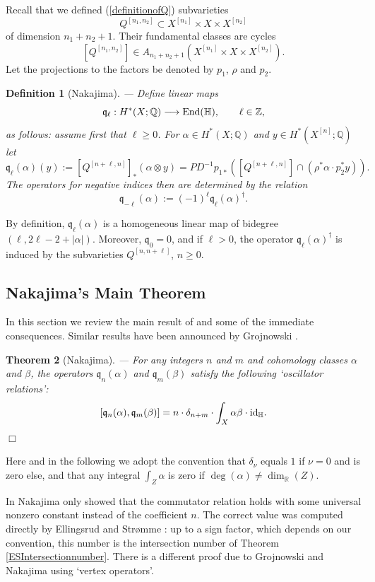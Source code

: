 \documentclass[twoside,11pt]{article}
\newtheorem{theorem}{Theorem}[section]
\newtheorem{definition}[theorem]{Definition}
\newcommand{\qed}{\hspace*{\fill}$\Box$\vspace{2ex}}
\newcommand{\IH}{{\mathbb H}}
\newcommand{\IQ}{{\mathbb Q}}
\newcommand{\IR}{{\mathbb R}}
\newcommand{\IZ}{{\mathbb Z}}
\newcommand{\gothq}{{\mathfrak q}}
\newcommand{\tensor}{\otimes}
\newcommand{\End}{{\rm End}}
\newcommand{\qq}{\gothq}
\newcommand{\id}{{\rm id}}
\newcommand{\lra}{\longrightarrow}
\begin{document}
Recall that we defined (\ref{definitionofQ}) subvarieties
$$Q^{[n_1,n_2]}\subset X^{[n_1]}\times X\times X^{[n_2]}$$
of dimension $n_1+n_2+1$. Their fundamental classes are cycles
$$[Q^{[n_1,n_2]}]\in A_{n_1+n_2+1}(X^{[n_1]}\times X\times X^{[n_2]}).$$
Let the projections to the factors be denoted by $p_1$, $\rho$ and $p_2$.

\begin{definition}[Nakajima]\label{definitionofoscillators}--- Define
linear maps
$$\qq_{\ell}:H^*(X;\IQ)\lra \End(\IH),\qquad \ell\in\IZ,$$
as follows: assume first that $\ell\geq0$.
For $\alpha\in H^*(X;\IQ)$ and $y\in H^*(X^{[n]};\IQ)$ let
$$\qq_\ell(\alpha)(y):=[Q^{[n+\ell,n]}]_*(\alpha\tensor y)=PD^{-1}p_{1*}(
[Q^{[n+\ell,n]}]\cap (\rho^*\alpha\cdot p_2^*y)).$$
The operators for negative indices then are determined by the relation $$\qq_{-\ell}(\alpha):=(-1)^\ell\qq_{\ell}(\alpha)^\dagger.$$
\end{definition}

By definition, $\qq_\ell(\alpha)$ is a homogeneous linear map of
bidegree $(\ell, 2\ell-2+|\alpha|)$. Moreover, $\qq_0=0$, and if $\ell>0$,
the operator $\qq_{\ell}(\alpha)^\dagger$ is induced by the subvarieties
$Q^{[n,n+\ell]}$, $n\geq 0$.

\subsection{Nakajima's Main Theorem}

In this section we review the main result of \cite{Nakajima} and some of the
immediate consequences. Similar results have been announced by Grojnowski
\cite{Grojnowski}. 

\begin{theorem}[Nakajima]\label{oscillatorrelation}---
For any integers $n$ and $m$ and cohomology classes $\alpha$ and $\beta$,
the operators $\qq_n(\alpha)$  and $\qq_m(\beta)$ satisfy the following `oscillator relations':
$$[\qq_n(\alpha),\qq_m(\beta)]=n\cdot\delta_{n+m}\cdot\int_X\alpha\beta\cdot\id_{\IH}.$$\qed
\end{theorem} 


Here and in the following we adopt the convention that $\delta_\nu$ equals
$1$ if $\nu=0$ and is zero else, and that any integral $\int_Z\alpha$ is zero
if $\deg(\alpha)\neq\dim_{\IR}(Z)$.

In \cite{Nakajima} Nakajima only showed that the commutator
relation holds with some universal nonzero constant instead of the coefficient
$n$. The correct value was computed directly by Ellingsrud and Str\o{}mme
\cite{EllStrCoefficient}: up to a sign factor, which depends on our
convention, this number is the intersection number of Theorem \ref{ESIntersectionnumber}. There is a different proof due to Grojnowski \cite{Grojnowski} and Nakajima \cite{NakajimaLectures} using `vertex operators'.
\end{document}
